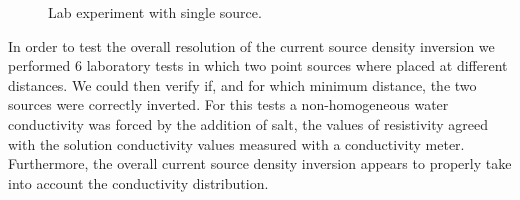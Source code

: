 \documentclass{article}
\begin{document}
\begin{figure}
	\caption{Lab experiment with single source.\label{LabExperiment}}
\end{figure}
\clearpage

In order to test the overall resolution of the current source density inversion we performed 6 laboratory tests in which two point sources where placed at different distances. We could then verify if, and for which minimum distance, the two sources were correctly inverted. For this tests a non-homogeneous water conductivity was forced by the addition of salt, the values of resistivity agreed with the solution conductivity values measured with a conductivity meter. Furthermore, the overall current source density inversion appears to properly take into account the conductivity distribution.

\begin{figure}[h]
	\centering
	\captionsetup[sub]{margin=0.4cm}

\end{figure}
\end{document}
